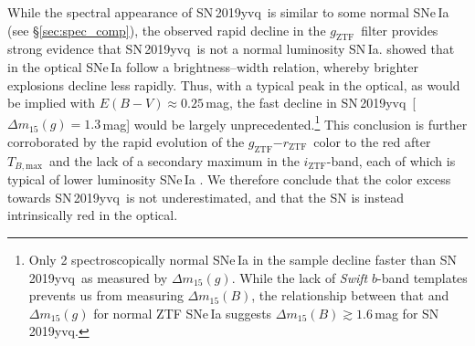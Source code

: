 \documentclass[twocolumn]{aastex63}
\newcommand{\fromkate}[1]{{\color{brown} fromKM: {#1}}}
\newcommand{\frommb}[1]{{\color{purple} fromMB: {#1}}}
\newcommand{\rztf}{$r_\mathrm{ZTF}$}
\newcommand{\gztf}{$g_\mathrm{ZTF}$}
\newcommand{\iztf}{$i_\mathrm{ZTF}$}
\newcommand{\tbmax}{$T_{B,\mathrm{max}}$}
\newcommand{\sn}{SN\,2019yvq}
\begin{document}
While the spectral appearance of \sn\ is similar to some normal SNe\,Ia (see
\S\ref{sec:spec_comp}), the observed rapid decline in the \gztf\ filter
provides strong evidence that \sn\ is not a normal luminosity SN\,Ia.
\citet{Phillips93} showed that in the optical SNe\,Ia follow a
brightness--width relation, whereby brighter explosions decline less rapidly.
Thus, with a typical peak in the optical, as would be implied with $E(B-V)
\approx 0.25$\,mag, the fast decline in \sn\ [$\Delta m_{15}(g) = 1.3$\,mag]
would be largely unprecedented.\footnote{Only 2 spectroscopically normal
SNe\,Ia in the \citet{Yao19} sample decline faster than \sn\ as measured by
$\Delta m_{15}(g)$. While the lack of \textit{Swift} $b$-band templates
prevents us from measuring $\Delta m_{15}(B)$, the relationship between that
and $\Delta m_{15}(g)$ for normal ZTF SNe\,Ia suggests $\Delta m_{15}(B)
\gtrsim 1.6$\,mag for \sn.} This conclusion is further corroborated by the
rapid evolution of the \gztf$-$\rztf\ color to the red after \tbmax\ and the
lack of a secondary maximum in the \iztf-band, each of which is typical of
lower luminosity SNe\,Ia \citep[see][and references therein]{Taubenberger17}.
We therefore conclude that the color excess towards \sn\ is not
underestimated, and that the SN is instead intrinsically red in the optical.


\end{document}
